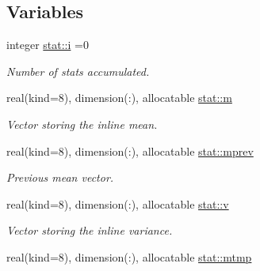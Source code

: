 \subsection*{Variables}
\begin{DoxyCompactItemize}
\item 
integer \hyperlink{namespacestat_aae82ae81e5eb5620583fec6c93aa6fa3}{stat\+::i} =0
\begin{DoxyCompactList}\small\item\em Number of stats accumulated. \end{DoxyCompactList}\item 
real(kind=8), dimension(\+:), allocatable \hyperlink{namespacestat_a2416f75ad24ac05a0ba615f9c8d467db}{stat\+::m}
\begin{DoxyCompactList}\small\item\em Vector storing the inline mean. \end{DoxyCompactList}\item 
real(kind=8), dimension(\+:), allocatable \hyperlink{namespacestat_adcf5178f8d91cdc53ff5f28cc3e04689}{stat\+::mprev}
\begin{DoxyCompactList}\small\item\em Previous mean vector. \end{DoxyCompactList}\item 
real(kind=8), dimension(\+:), allocatable \hyperlink{namespacestat_ab2a3ce8c90189fdbd6bb313c75876473}{stat\+::v}
\begin{DoxyCompactList}\small\item\em Vector storing the inline variance. \end{DoxyCompactList}\item 
real(kind=8), dimension(\+:), allocatable \hyperlink{namespacestat_a24c9afb1c1c6692185b509fd364508c8}{stat\+::mtmp}
\end{DoxyCompactItemize}
